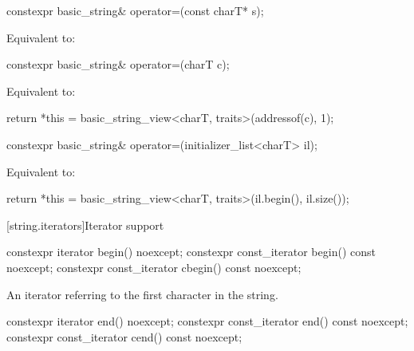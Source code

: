 %
\begin{itemdecl}
constexpr basic_string& operator=(const charT* s);
\end{itemdecl}

\begin{itemdescr}
\pnum
\effects
Equivalent to:
\end{itemdescr}

%
\begin{itemdecl}
constexpr basic_string& operator=(charT c);
\end{itemdecl}

\begin{itemdescr}
\pnum
\effects
Equivalent to:
\begin{codeblock}
return *this = basic_string_view<charT, traits>(addressof(c), 1);
\end{codeblock}
\end{itemdescr}

%
\begin{itemdecl}
constexpr basic_string& operator=(initializer_list<charT> il);
\end{itemdecl}

\begin{itemdescr}
\pnum
\effects
Equivalent to:
\begin{codeblock}
return *this = basic_string_view<charT, traits>(il.begin(), il.size());
\end{codeblock}
\end{itemdescr}

[string.iterators]{Iterator support}

%
%
\begin{itemdecl}
constexpr iterator       begin() noexcept;
constexpr const_iterator begin() const noexcept;
constexpr const_iterator cbegin() const noexcept;
\end{itemdecl}

\begin{itemdescr}
\pnum
\returns
An iterator referring to the first character in the string.
\end{itemdescr}

%
%
\begin{itemdecl}
constexpr iterator       end() noexcept;
constexpr const_iterator end() const noexcept;
constexpr const_iterator cend() const noexcept;
\end{itemdecl}


